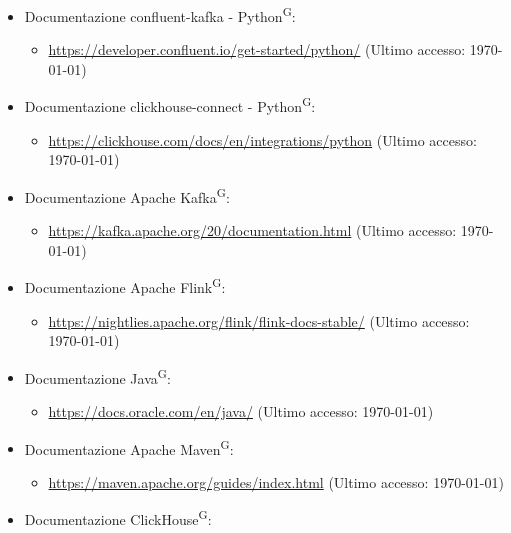 \documentclass[8pt]{article}
\newcommand{\glossterm}[1]{#1\textsuperscript{G}} %
\begin{document}
\begin{itemize}
    \item Documentazione confluent-kafka - \glossterm{Python}:
    \begin{itemize}
	\setlength\itemsep{0em}
		\item \href{https://developer.confluent.io/get-started/python/}{\color{myblue}https://developer.confluent.io/get-started/python/} (Ultimo accesso: \today)
	\end{itemize}
    \item Documentazione clickhouse-connect - \glossterm{Python}:
    \begin{itemize}
	\setlength\itemsep{0em}
		\item \href{https://clickhouse.com/docs/en/integrations/python}{\color{myblue}https://clickhouse.com/docs/en/integrations/python} (Ultimo accesso: \today)
	\end{itemize}
    \item Documentazione Apache \glossterm{Kafka}:
    \begin{itemize}
	\setlength\itemsep{0em}
		\item \href{https://kafka.apache.org/20/documentation.html}{\color{myblue}https://kafka.apache.org/20/documentation.html} (Ultimo accesso: \today)
	\end{itemize}
    \item Documentazione Apache \glossterm{Flink}:
    \begin{itemize}
	\setlength\itemsep{0em}
		\item \href{https://nightlies.apache.org/flink/flink-docs-stable/}{\color{myblue}https://nightlies.apache.org/flink/flink-docs-stable/} (Ultimo accesso: \today)
	\end{itemize}
    \item Documentazione \glossterm{Java}:
    \begin{itemize}
	\setlength\itemsep{0em}
		\item \href{https://docs.oracle.com/en/java/}{\color{myblue}https://docs.oracle.com/en/java/} (Ultimo accesso: \today)
	\end{itemize}
    \item Documentazione Apache \glossterm{Maven}:
    \begin{itemize}
	\setlength\itemsep{0em}
		\item \href{https://maven.apache.org/guides/index.html}{\color{myblue}https://maven.apache.org/guides/index.html} (Ultimo accesso: \today)
	\end{itemize}
    \item Documentazione \glossterm{ClickHouse}:

\end{itemize}
\end{document}
